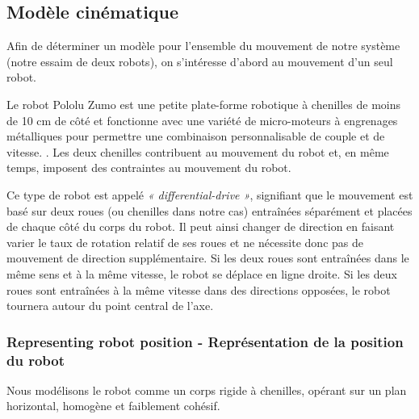 \subsection{Modèle cinématique}

Afin de déterminer un modèle pour l'ensemble du mouvement de notre système (notre essaim de deux robots), on s'intéresse d'abord au mouvement d'un seul robot. 

Le robot Pololu Zumo est une petite plate-forme robotique à chenilles de moins de 10 cm de côté et fonctionne avec une variété de micro-moteurs à engrenages métalliques pour permettre une combinaison personnalisable de couple et de vitesse. \cite{pololu-url}. Les deux chenilles contribuent au mouvement du robot et, en même temps, imposent des contraintes au mouvement du robot. 

Ce type de robot est appelé \textit{« differential-drive »}, signifiant que le mouvement est basé sur deux roues (ou chenilles dans notre cas) entraînées séparément et placées de chaque côté du corps du robot. Il peut ainsi changer de direction en faisant varier le taux de rotation relatif de ses roues et ne nécessite donc pas de mouvement de direction supplémentaire. Si les deux roues sont entraînées dans le même sens et à la même vitesse, le robot se déplace en ligne droite. Si les deux roues sont entraînées à la même vitesse dans des directions opposées, le robot tournera autour du point central de l'axe. \cite{Differential-drive-wikipedia-url}

\subsubsection{Representing robot position - Représentation de la position du robot}

Nous modélisons le robot comme un corps rigide à chenilles, opérant sur un plan horizontal, homogène et faiblement cohésif. 

